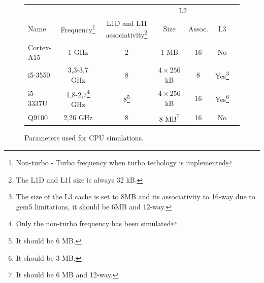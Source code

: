 \documentclass{article}
\begin{document}
\begin{figure}[ht]
\begin{center}

\begin{tabular}{| l | c | c | c | c | c | c |}
\hline 
& & & \multicolumn{2}{c|}{L2} &\\
Name & Frequency\footnote{Non-turbo - Turbo frequency when turbo techology is implemented} & L1D and L1I associativity\footnote{The L1D and L1I size is always 32 kB.} & Size & Assoc. & L3 \\
\hline

Cortex-A15 & 1 GHz & 2 & 1 MB & 16 & No \\

i5-3550 & 3,3-3,7 GHz & 8 & $4 \times 256$ kB & 8 & Yes\footnote{The size of the L3 cache is set to 8MB and its associativity to 16-way due to gem5 limitations, it should be 6MB and 12-way.}\\

i5-3337U & 1,8-2,7\footnote{Only the non-turbo frequency has been simulated} GHz & 8\footnote{It should be 6 MB.} & $4 \times 256$ kB & 16 & Yes\footnote{It should be 3 MB.}\\

Q9100 & 2,26 GHz & 8 & 8 MB\footnote{It should be 6 MB and 12-way.} & 16 & No\\



\hline

\end{tabular}
\caption{\label{cpu_setup}Parameters used for CPU simulations.}
\end{center}
\end{figure}
\end{document}
